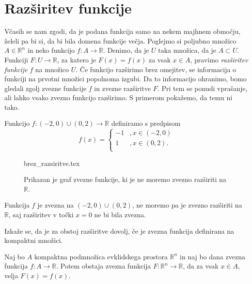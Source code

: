 \documentclass[mat1]{fmfdelo}
\newcommand{\R}{\mathbb R}
\newcommand{\0}{\underline{0}}
\begin{document}
\section{Razširitev funkcije}\label{raz:siritev}
Včasih se nam zgodi, da je podana funkcija samo na nekem majhnem območju, želeli pa bi si, da bi bila domena funkcije večja. Poglejmo si poljubno množico $A \in \R^n$ in neko funkcijo $f : A \to \R$. Denimo, da je $U$ taka množica, da je $A \subset U$. Funkciji $F : U \to \R$, za katero je $F(x) = f(x)$ za vsak $x \in A$, pravimo \emph{razširitev funkcije} $f$ na množico $U$. Če funkcijo razširimo brez omejitev, se informacija o funkciji na prvotni množici popolnoma izgubi. Da to informacijo ohranimo, bomo gledali zgolj zvezne funkcije $f$ in zvezne razširitve $F$. Pri tem se ponudi vprašanje, ali lahko vsako zvezno funkcijo razširimo. S primerom pokažemo, da temu ni tako.

\begin{primer}
Funkcijo $f : (-2, 0) \cup (0, 2) \to \R$ definiramo s predpisom
\[  f(x) = \left \{
\begin{array}{ll}
	-1 &, x \in (-2, 0)\\
	1 &, x \in (0, 2). \\
\end{array} 
\right. \]
\begin{figure}[h!]
	\centering
	{brez_razsiritve.tex}
	\caption{Prikazan je graf zvezne funkcije, ki je ne moremo zvezno razširiti na $\R$.}
\end{figure}
Funkcija $f$ je zvezna na $(-2, 0) \cup (0, 2)$, ne moremo pa je zvezno razširiti na $\R$, saj razširitev v točki $x = 0$ ne bi bila zvezna.
\end{primer}

Izkaže se, da je za obstoj razširitve dovolj, če je zvezna funkcija definirana na kompaktni množici.

\begin{lema}\label{lem:razsiritev}
Naj bo $A$ kompaktna podmnožica evklidskega prostora $\R^n$ in naj bo dana zvezna funkcija $f : A \to \R$. Potem obstaja zvezna funkcija $F : \R^n \to \R$, da za vsak $x \in A$, velja $F(x) = f(x)$.
\end{lema}
\end{document}
